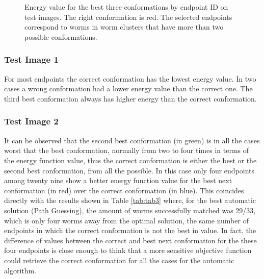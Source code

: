 \captionsetup[subfloat]{farskip=-0.8cm,captionskip=-0.2cm}

\begin{figure}[htp]
  \begin{center}
    \\
    \\
  \end{center}
  \caption{Energy value for the best three conformations by endpoint ID on test
images. The right conformation is red. The selected endpoints correspond to worms in worm clusters that
have more than two possible conformations.}
  \label{fig:energy123}
\end{figure}

\subsubsection*{Test Image 1}

For most endpoints the correct conformation has the lowest energy value.
In two cases a wrong conformation had a lower energy value than the correct
one. The third best conformation always has higher energy than the correct conformation.\\

\subsubsection*{Test Image 2}


It can be observed that the second best conformation (in green) is in all 
the cases worst that the best conformation, normally from two to four times 
in terms of the energy function value, thus the correct conformation is 
either the best or the second best conformation, from all the possible.
In this case only four endpoints among twenty nine show a better energy
function value for the best next conformation (in red) over the correct 
conformation (in blue). This coincides directly with the results shown
in Table \ref{tab:tab3} where, for the best automatic solution (Path Guessing),
the amount of worms successfully matched was 29/33, which is only four worms
away from the optimal solution, the same number of endpoints in which the
correct conformation is not the best in value. In fact, the difference of 
values between the correct and best next conformation for the these four
endpoints is close enough to think that a more sensitive objective function
could retrieve the correct conformation for all the cases for the automatic
algorithm.\\ 

